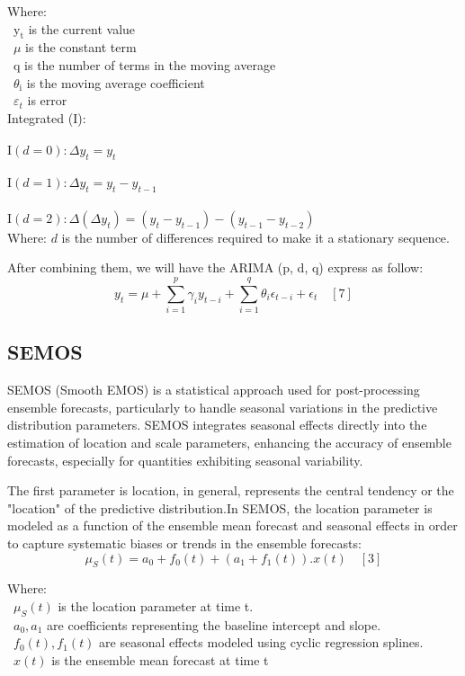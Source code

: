 \documentclass{ieeeojies}
\begin{document}
Where: \\
\indent\textbullet\ \(\mathrm{y}_{\mathrm{t}}\) is the current value \\ 
\indent\textbullet\ \(\mu\) is the constant term \\ 
\indent\textbullet\ \(\mathrm{q}\) is the number of terms in the moving average \\ 
\indent\textbullet\ \(\theta_{\mathrm{i}}\) is the moving average coefficient \\ 
\indent\textbullet\ \(\varepsilon_{t}\) is error \\
Integrated (I):\\
 \\$\mathrm{I}(d=0): \Delta y_t=y_t$\\
 \\$\mathrm{I}(d=1): \Delta y_t=y_t-y_{t-1}$\\
 \\$\mathrm{I}(d=2): \Delta\left(\Delta y_t\right)=\left(y_t-y_{t-1}\right)-\left(y_{t-1}-y_{t-2}\right)$ \\
 Where: \(d\) is the number of differences required to make it a stationary sequence. 

After combining them, we will have the ARIMA (p, d, q) express as follow:
$$
y_t=\mu+\sum_{i=1}^p \gamma_i y_{t-i}+\sum_{i=1}^q \theta_i \epsilon_{t-i}+\epsilon_t \quad [7]
$$
\subsection{SEMOS}
SEMOS (Smooth EMOS) is a statistical approach used for post-processing ensemble forecasts, particularly to handle seasonal variations in the predictive distribution parameters. SEMOS integrates seasonal effects directly into the estimation of location and scale parameters, enhancing the accuracy of ensemble forecasts, especially for quantities exhibiting seasonal variability.

The first parameter is location, in general, represents the central tendency or the "location" of the predictive distribution.In SEMOS, the location parameter is modeled as a function of the ensemble mean forecast and seasonal effects in order to capture systematic biases or trends in the ensemble forecasts:
$$
\mu_S(t) = a_0 + f_0(t) + (a_1 + f_1(t)) . x(t) \quad[3]
$$

Where: \\
        \indent\textbullet\ \(\mu_S(t)\) is the location parameter at time t. \\
        \indent\textbullet\ \(a_0, a_1\) are coefficients representing the baseline intercept and slope. \\
        \indent\textbullet\ \(f_0(t), f_1(t)\) are seasonal effects modeled using cyclic regression splines. \\
        \indent\textbullet\ \(x(t)\) is the ensemble mean forecast at time t \\
\end{document}
